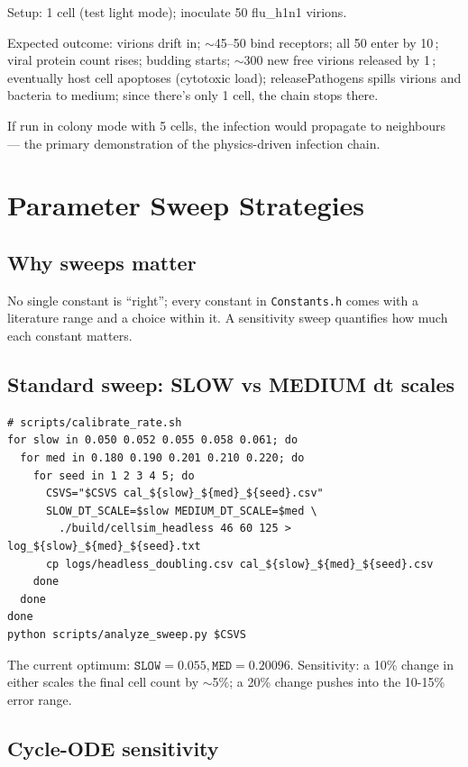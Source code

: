 \documentclass[11pt,letterpaper,twoside,openany]{book}
\newcommand{\code}[1]{\texttt{#1}}
\newcommand{\file}[1]{\texttt{\small#1}}
\newcommand{\bioh}{\text{bio-h}}
\newcommand{\biomin}{\text{bio-min}}
\begin{document}
Setup: 1 cell (test light mode); inoculate 50 flu\_h1n1 virions.

Expected outcome: virions drift in; $\sim$45--50 bind receptors;
all 50 enter by 10\,\biomin; viral protein count rises; budding
starts; $\sim$300 new free virions released by 1\,\bioh;
eventually host cell apoptoses (cytotoxic load); releasePathogens
spills virions and bacteria to medium; since there's only 1 cell,
the chain stops there.

If run in colony mode with 5 cells, the infection would propagate
to neighbours --- the primary demonstration of the physics-driven
infection chain.

\chapter{Parameter Sweep Strategies}
\label{ch:sweeps}

\section{Why sweeps matter}

No single constant is ``right''; every constant in
\file{Constants.h} comes with a literature range and a choice
within it. A sensitivity sweep quantifies how much each constant
matters.

\section{Standard sweep: SLOW vs MEDIUM dt scales}

\begin{verbatim}
# scripts/calibrate_rate.sh
for slow in 0.050 0.052 0.055 0.058 0.061; do
  for med in 0.180 0.190 0.201 0.210 0.220; do
    for seed in 1 2 3 4 5; do
      CSVS="$CSVS cal_${slow}_${med}_${seed}.csv"
      SLOW_DT_SCALE=$slow MEDIUM_DT_SCALE=$med \
        ./build/cellsim_headless 46 60 125 > log_${slow}_${med}_${seed}.txt
      cp logs/headless_doubling.csv cal_${slow}_${med}_${seed}.csv
    done
  done
done
python scripts/analyze_sweep.py $CSVS
\end{verbatim}

The current optimum: $\code{SLOW}=0.055, \code{MED}=0.20096$.
Sensitivity: a 10\% change in either scales the final cell count by
$\sim$5\%; a 20\% change pushes into the 10-15\% error range.

\section{Cycle-ODE sensitivity}
\end{document}
